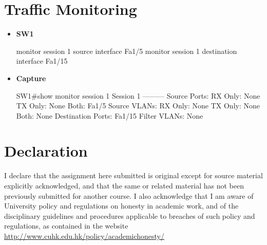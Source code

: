 \documentclass[10pt]{article}
\begin{document}
\section{Traffic Monitoring}
\begin{itemize}
	\item {\bf SW1}
	\begin{verbatim*}
		monitor session 1 source interface Fa1/5
		monitor session 1 destination interface Fa1/15
	\end{verbatim*}
	\item {\bf Capture}
	\begin{verbatim*}
		SW1#show monitor session 1
		Session 1
		---------
		Source Ports:
		RX Only:       None
		TX Only:       None
		Both:          Fa1/5
		Source VLANs:
		RX Only:       None
		TX Only:       None
		Both:          None
		Destination Ports: Fa1/15
		Filter VLANs:      None
	\end{verbatim*}
\end{itemize}
\newpage
\appendix
\section{Declaration}
I declare that the assignment here submitted is original except for source material explicitly acknowledged, and that the same or related material has not been previously submitted for another course. I also acknowledge that I am aware of University policy and regulations on honesty in academic work, and of the disciplinary guidelines and procedures applicable to breaches of such policy and regulations, as contained in the website \url{http://www.cuhk.edu.hk/policy/academichonesty/}
\vspace*{3cm}
\end{document}
